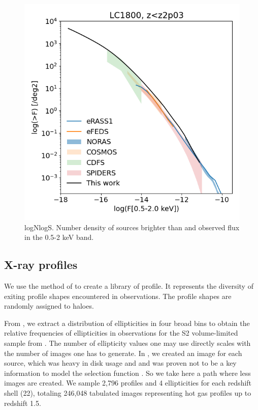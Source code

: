 \documentclass[twocolumn,iop]{openjournal}
\begin{document}
\begin{figure}
    \includegraphics[width=0.8\linewidth]{figures_GAS/LC1800_zlt_z2p03_logNlogS.png}
    \caption{logNlogS. Number density of sources brighter than and observed flux in the 0.5-2 keV band. }
    \label{fig:logNlogS}
\end{figure}

\subsection{X-ray profiles}

We use the method of \citet{ComparatEckertFinoguenov_2020OJAp....3E..13C} to create a library of profile. It represents the diversity of exiting profile shapes encountered in observations. 
The profile shapes are randomly assigned to haloes. 

From \citet{SandersBaharBulbul_2025A&A...695A.160S}, we extract a distribution of ellipticities in four broad bins to obtain the relative frequencies of ellipticities in observations for the S2 volume-limited sample from \citet{SeppiComparatGhirardini_2024A&A...686A.196S}. 
The number of ellipticity values one may use directly scales with the number of images one has to generate. 
In \citet{ComparatEckertFinoguenov_2020OJAp....3E..13C, SeppiComparatBulbul_2022A&A...665A..78S}, we created an image for each source, which was heavy in disk usage and and was proven not to be a key information to model the selection function \citep{SeppiComparatBulbul_2022A&A...665A..78S, ClercComparatSeppi_2024A&A...687A.238C}. 
So we take here a path where less images are created. We sample 2,796 profiles and 4 ellipticities for each redshift shell (22), totaling 246,048 tabulated images representing hot gas profiles up to redshift 1.5.
\end{document}
